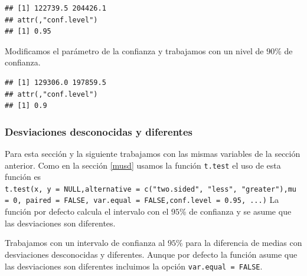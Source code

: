 \documentclass[
]{krantz}
\makeatletter
\newenvironment{Shaded}{\begin{snugshade}}{\end{snugshade}}
\newcommand{\DataTypeTok}[1]{\textcolor[rgb]{0.27,0.27,0.27}{#1}}
\newcommand{\FloatTok}[1]{\textcolor[rgb]{0.06,0.06,0.06}{#1}}
\newcommand{\KeywordTok}[1]{\textcolor[rgb]{0.27,0.27,0.27}{\textbf{#1}}}
\newcommand{\NormalTok}[1]{#1}
\newcommand{\OperatorTok}[1]{\textcolor[rgb]{0.43,0.43,0.43}{\textbf{#1}}}
\newcommand{\OtherTok}[1]{\textcolor[rgb]{0.37,0.37,0.37}{#1}}
\newenvironment{kframe}{%
\medskip{}
\setlength{\fboxsep}{.8em}
 \def\at@end@of@kframe{}%
 \ifinner\ifhmode%
  \def\at@end@of@kframe{\end{minipage}}%
  \begin{minipage}{\columnwidth}%
 \fi\fi%
 \def\FrameCommand##1{\hskip\@totalleftmargin \hskip-\fboxsep
 \colorbox{shadecolor}{##1}\hskip-\fboxsep
     \hskip-\linewidth \hskip-\@totalleftmargin \hskip\columnwidth}%
 \MakeFramed {\advance\hsize-\width
   \@totalleftmargin\z@ \linewidth\hsize
   \@setminipage}}%
 {\par\unskip\endMakeFramed%
 \at@end@of@kframe}
\renewenvironment{Shaded}{\begin{kframe}}{\end{kframe}}
\makeatother
\begin{document}
\begin{verbatim}
## [1] 122739.5 204426.1
## attr(,"conf.level")
## [1] 0.95
\end{verbatim}

Modificamos el parámetro de la confianza y trabajamos con un nivel de \(90\%\) de confianza.

\begin{Shaded}
\end{Shaded}

\begin{verbatim}
## [1] 129306.0 197859.5
## attr(,"conf.level")
## [1] 0.9
\end{verbatim}

\hypertarget{icddd}{%
\subsubsection{Desviaciones desconocidas y diferentes}\label{icddd}}

Para esta sección y la siguiente trabajamos con las mismas variables de la sección anterior. Como en la sección \ref{musd} usamos la función \texttt{t.test} el uso de esta función es \texttt{t.test(x,\ y\ =\ NULL,alternative\ =\ c("two.sided",\ "less",\ "greater"),mu\ =\ 0,\ paired\ =\ FALSE,\ var.equal\ =\ FALSE,conf.level\ =\ 0.95,\ ...)} La función por defecto calcula el intervalo con el \(95\)\% de confianza y se asume que las desviaciones son diferentes.

Trabajamos con un intervalo de confianza al \(95\)\% para la diferencia de medias con desviaciones desconocidas y diferentes. Aunque por defecto la función asume que las desviaciones son diferentes incluimos la opción \texttt{var.equal\ =\ FALSE}.

\begin{Shaded}
\end{Shaded}
\end{document}
